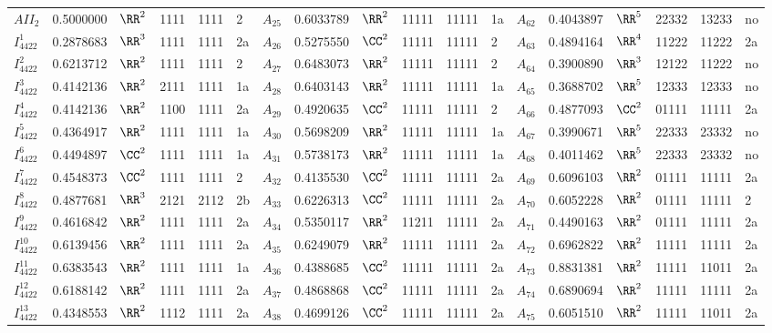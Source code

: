 \begin{table}[tbm]
\begin{tabular}{l l l l l l l l l l l l l l l l l l}
 $AII_2$&0.5000000&$\RR^2$&1111&1111&2&\hphantom{v}$A_{25}$&0.6033789&$\RR^2$&11111&11111&1a&\hphantom{v}$A_{62}$&0.4043897&$\RR^5$&22332&13233&no\\
 $I^1_{4422}$&0.2878683&$\RR^3$&1111&1111&2a&\hphantom{v}$A_{26}$&0.5275550&$\CC^2$&11111&11111&2&\hphantom{v}$A_{63}$&0.4894164&$\RR^4$&11222&11222&2a\\
 $I^2_{4422}$&0.6213712&$\RR^2$&1111&1111&2&\hphantom{v}$A_{27}$&0.6483073&$\RR^2$&11111&11111&2&\hphantom{v}$A_{64}$&0.3900890&$\RR^3$&12122&11222&no\\
 $I^3_{4422}$&0.4142136&$\RR^2$&2111&1111&1a&\hphantom{v}$A_{28}$&0.6403143&$\RR^2$&11111&11111&1a&\hphantom{v}$A_{65}$&0.3688702&$\RR^5$&12333&12333&no\\
 $I^4_{4422}$&0.4142136&$\RR^2$&1100&1111&2a&\hphantom{v}$A_{29}$&0.4920635&$\CC^2$&11111&11111&2&\hphantom{v}$A_{66}$&0.4877093&$\CC^2$&01111&11111&2a\\
 $I^5_{4422}$&0.4364917&$\RR^2$&1111&1111&1a&\hphantom{v}$A_{30}$&0.5698209&$\RR^2$&11111&11111&1a&\hphantom{v}$A_{67}$&0.3990671&$\RR^5$&22333&23332&no\\
 $I^6_{4422}$&0.4494897&$\CC^2$&1111&1111&1a&\hphantom{v}$A_{31}$&0.5738173&$\RR^2$&11111&11111&1a&\hphantom{v}$A_{68}$&0.4011462&$\RR^5$&22333&23332&no\\
 $I^7_{4422}$&0.4548373&$\CC^2$&1111&1111&2&\hphantom{v}$A_{32}$&0.4135530&$\CC^2$&11111&11111&2a&\hphantom{v}$A_{69}$&0.6096103&$\RR^2$&01111&11111&2a\\
 $I^8_{4422}$&0.4877681&$\RR^3$&2121&2112&2b&\hphantom{v}$A_{33}$&0.6226313&$\CC^2$&11111&11111&2a&\hphantom{v}$A_{70}$&0.6052228&$\RR^2$&01111&11111&2\\
 $I^9_{4422}$&0.4616842&$\RR^2$&1111&1111&2a&\hphantom{v}$A_{34}$&0.5350117&$\RR^2$&11211&11111&2a&\hphantom{v}$A_{71}$&0.4490163&$\RR^2$&01111&11111&2a\\
 $I^{10}_{4422}$&0.6139456&$\RR^2$&1111&1111&2a&\hphantom{v}$A_{35}$&0.6249079&$\RR^2$&11111&11111&2a&\hphantom{v}$A_{72}$&0.6962822&$\RR^2$&11111&11111&2a\\
 $I^{11}_{4422}$&0.6383543&$\RR^2$&1111&1111&1a&\hphantom{v}$A_{36}$&0.4388685&$\CC^2$&11111&11111&2a&\hphantom{v}$A_{73}$&0.8831381&$\RR^2$&11111&11011&2a\\
 $I^{12}_{4422}$&0.6188142&$\RR^2$&1111&1111&2a&\hphantom{v}$A_{37}$&0.4868868&$\CC^2$&11111&11111&2a&\hphantom{v}$A_{74}$&0.6890694&$\RR^2$&11111&11111&2a\\
 $I^{13}_{4422}$&0.4348553&$\RR^2$&1112&1111&2a&\hphantom{v}$A_{38}$&0.4699126&$\CC^2$&11111&11111&2a&\hphantom{v}$A_{75}$&0.6051510&$\RR^2$&11111&11011&2a\\

\end{tabular}
\end{table}
